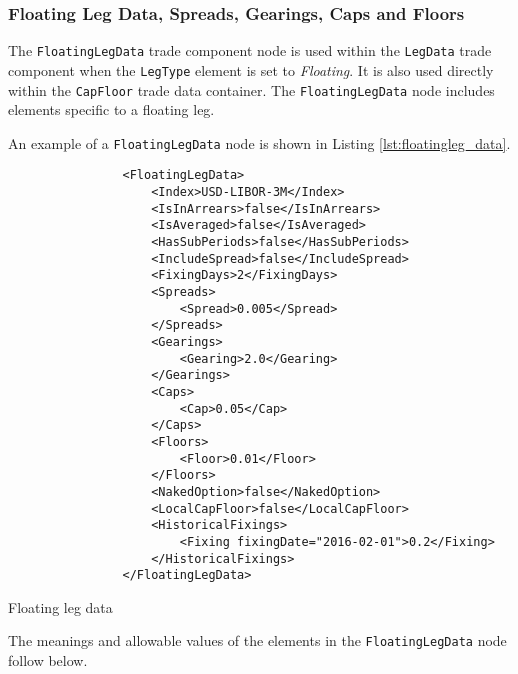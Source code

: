 \subsubsection{Floating Leg Data, Spreads, Gearings, Caps and Floors}
\label{ss:floatingleg_data}

The \lstinline!FloatingLegData! trade component node is used within the \lstinline!LegData! trade component when the
\lstinline!LegType! element is set to \emph{Floating}. It is also used directly within the \lstinline!CapFloor! trade
data container.  The \lstinline!FloatingLegData! node includes elements specific to a floating leg.

An example of a \lstinline!FloatingLegData! node is shown in Listing \ref{lst:floatingleg_data}.
\begin{listing}[H]
\begin{verbatim}
                <FloatingLegData>
                    <Index>USD-LIBOR-3M</Index>
                    <IsInArrears>false</IsInArrears>
                    <IsAveraged>false</IsAveraged>
                    <HasSubPeriods>false</HasSubPeriods>
                    <IncludeSpread>false</IncludeSpread>
                    <FixingDays>2</FixingDays>
                    <Spreads>
                        <Spread>0.005</Spread>
                    </Spreads>
                    <Gearings>
                        <Gearing>2.0</Gearing>
                    </Gearings>
                    <Caps>
                        <Cap>0.05</Cap>
                    </Caps>
                    <Floors>
                        <Floor>0.01</Floor>
                    </Floors>
                    <NakedOption>false</NakedOption>
                    <LocalCapFloor>false</LocalCapFloor>
                    <HistoricalFixings>
            			<Fixing fixingDate="2016-02-01">0.2</Fixing>
			        </HistoricalFixings>
                </FloatingLegData>
\end{verbatim}
\caption{Floating leg data}
\label{lst:floatingleg_data}
\end{listing}

The meanings and allowable values of the elements in the \lstinline!FloatingLegData! node follow below.

